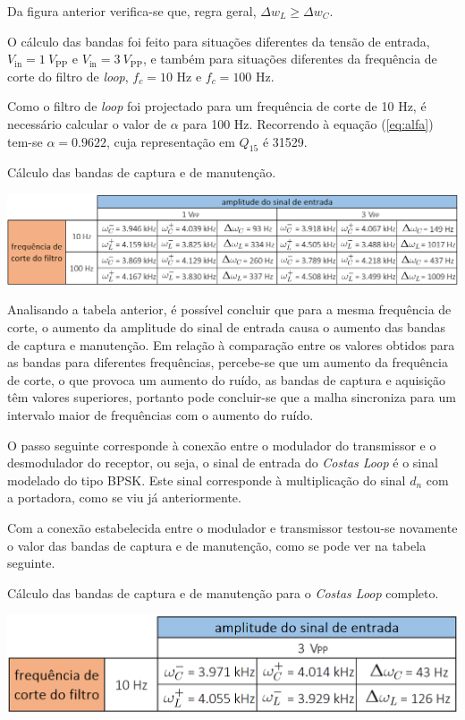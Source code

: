 \documentclass[11pt]{article}
\numberwithin{equation}{section}
\begin{document}
{Da figura anterior verifica-se que, regra geral, $\Delta w_L \geq \Delta w_C$.

O cálculo das bandas foi feito para situações diferentes da tensão de entrada, $V_{\text{in}} = 1~V_{\text{PP}}$ e $V_{\text{in}} = 3~V_{\text{PP}}$, e também para situações diferentes da frequência de corte do filtro de \textit{loop}, $f_{c} = 10$ Hz e $f_{c} = 100$ Hz.

Como o filtro de \textit{loop} foi projectado para um frequência de corte de 10 Hz, é necessário calcular o valor de $\alpha$ para 100 Hz. Recorrendo à equação (\ref{eq:alfa}) tem-se $\alpha = 0.9622$, cuja representação em $Q_{15}$ é 31529. 

\begin{table}[H]
	\centering
	\caption{Cálculo das bandas de captura e de manutenção.}
	\vspace{-1.5mm}
	\includegraphics[keepaspectratio=true, scale=0.35]{tabelas/bandas}
\end{table}

Analisando a tabela anterior, é possível concluir que para a mesma frequência de corte, o aumento da amplitude do sinal de entrada causa o aumento das bandas de captura e manutenção. Em relação à comparação entre os valores obtidos para as bandas para diferentes frequências, percebe-se que um aumento da frequência de corte, o que provoca um aumento do ruído, as bandas de captura e aquisição têm valores superiores, portanto pode concluir-se que a malha sincroniza para um intervalo maior de frequências com o aumento do ruído.

O passo seguinte corresponde à conexão entre o modulador do transmissor e o desmodulador do receptor, ou seja, o sinal de entrada do \textit{Costas Loop} é o sinal modelado do tipo BPSK. Este sinal corresponde à multiplicação do sinal $d_n$ com a portadora, como se viu já anteriormente.


Com a conexão estabelecida entre o modulador e transmissor testou-se novamente o valor das bandas de captura e de manutenção, como se pode ver na tabela seguinte.

\begin{table}[H]
	\centering
	\caption{Cálculo das bandas de captura e de manutenção para o \textit{Costas Loop} completo.}
	\vspace{-1.5mm}
	\includegraphics[keepaspectratio=true, scale=0.35]{tabelas/bandascompleto}
\end{table}


}
\end{document}

